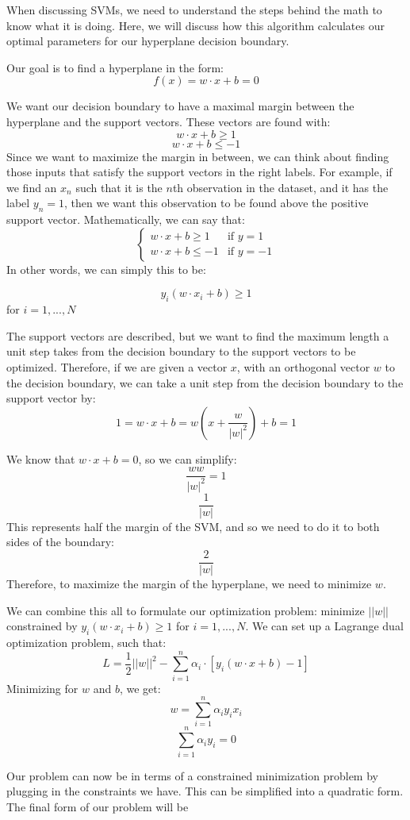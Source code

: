 \documentclass[12pt]{article}
\begin{document}
When discussing SVMs, we need to understand the steps behind the math to know what it is doing. Here, we will discuss how this algorithm calculates our optimal parameters for our hyperplane decision boundary.

Our goal is to find a hyperplane in the form:
$$f(x) = w \cdot x + b = 0$$

We want our decision boundary to have a maximal margin between the hyperplane and the support vectors. These vectors are found with:
$$w \cdot x + b \geq 1$$
$$w \cdot x + b  \leq -1$$
Since we want to maximize the margin in between, we can think about finding those inputs that satisfy the support vectors in the right labels. For example, if we find an $x_n$ such that it is the $n$th observation in the dataset, and it has the label $y_n = 1$, then we want this observation to be found above the positive support vector. Mathematically, we can say that:
$$\begin{cases}
      w \cdot x + b \geq 1 & \text{if } y = 1 \\
      w \cdot x + b \leq -1 & \text{if } y = -1
\end{cases}$$
In other words, we can simply this to be:

$$y_i (w \cdot x_i + b) \geq 1$$ for $i = 1,...,N$

The support vectors are described, but we want to find the maximum length a unit step takes from the decision boundary to the support vectors to be optimized. Therefore, if we are given a vector $x$, with an orthogonal vector $w$ to the decision boundary, we can take a unit step from the decision boundary to the support vector by:
$$1 = w \cdot x + b = w(x + \frac{w}{|w|^2}) + b = 1$$

We know that $w \cdot x + b = 0$, so we can simplify:
$$\frac{ww}{|w|^2} = 1$$
$$\frac{1}{|w|}$$
This represents half the margin of the SVM, and so we need to do it to both sides of the boundary:
$$\frac{2}{|w|}$$
Therefore, to maximize the margin of the hyperplane, we need to minimize $w$.

We can combine this all to formulate our optimization problem: minimize $||w||$ constrained by $y_i (w \cdot x_i + b) \geq 1$ for $i = 1,..., N$.
We can set up a Lagrange dual optimization problem, such that:
$$L = \frac{1}{2}||w||^2 - \sum_{i=1}^{n} \alpha_i \cdot [y_i(w \cdot x + b) - 1]$$
Minimizing for $w$ and $b$, we get:
$$w = \sum_{i=1}^{n} \alpha_i y_i x_i$$
$$\sum_{i=1}^{n} \alpha_i y_i = 0$$

Our problem can now be in terms of a constrained minimization problem by plugging in the constraints we have. This can be simplified into a quadratic form. The final form of our problem will be
\end{document}
